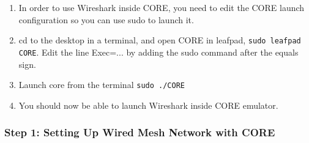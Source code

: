 \documentclass[main.tex]{subfiles}
\begin{document}
\begin{enumerate}[noitemsep,label=$\bullet$,leftmargin=20mm,labelsep=0.5cm]
\item In order to use Wireshark inside CORE, you need to edit the CORE launch configuration so you can use sudo to launch it.

\item cd to the desktop in a terminal, and open CORE in leafpad, \texttt{sudo leafpad CORE}.  Edit the line Exec=... by adding the sudo command after the equals sign.

\item Launch core from the terminal \texttt{sudo ./CORE}
\item You should now be able to launch Wireshark inside CORE emulator.


\end{enumerate}


\subsubsection{Step 1:  Setting Up Wired Mesh Network with CORE  } 
\end{document}
